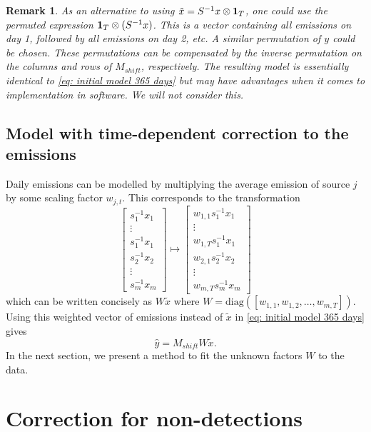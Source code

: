\documentclass{article}
\newtheorem{remark}[proposition]{Remark}
\begin{document}
\begin{remark}
    As an alternative to using $\tilde{x} = S^{-1} x \otimes \vb{1}_T$, one could use the permuted expression $\vb{1}_{T} \otimes (S^{-1} x)$. This is a vector containing all emissions on day 1, followed by all emissions on day 2, etc. A similar permutation of $y$ could be chosen. These permutations can be compensated by the inverse permutation on the columns and rows of $M_{shift}$, respectively. The resulting model is essentially identical to \cref{eq: initial model 365 days} but may have advantages when it comes to implementation in software. We will not consider this.
\end{remark}

\subsection{Model with time-dependent correction to the emissions}
Daily emissions can be modelled by multiplying the average emission of source $j$ by some scaling factor $w_{j,t}$. This corresponds to the 
transformation
$$
\begin{bmatrix}
    s_1^{-1} x_1 \\
    \vdots \\
    s_1^{-1} x_1 \\ 
    s_2^{-1} x_2 \\
    \vdots \\ 
    s_m^{-1} x_m
\end{bmatrix}
\mapsto
\begin{bmatrix}
    w_{1,1} s_1^{-1} x_1 \\
    \vdots \\
    w_{1,T} s_1^{-1} x_1 \\ 
    w_{2,1} s_2^{-1} x_2 \\
    \vdots \\ 
    w_{m, T} s_m^{-1} x_m
\end{bmatrix}
$$
which can be written concisely as $W\tilde{x}$ where $W = \mathrm{diag}([w_{1,1}, w_{1,2},\dots,w_{m,T}])$.
Using this weighted vector of emissions instead of $\tilde{x}$ in \cref{eq: initial model 365 days} gives
\begin{equation}
    \label{eq: time-evolving model concise}
\hat{y} = M_{shift} W \tilde{x}
.\end{equation}
In the next section, we present a method to fit the unknown factors $W$ to the data.

\section{Correction for non-detections}
\label{sec: nondetections}
\end{document}
